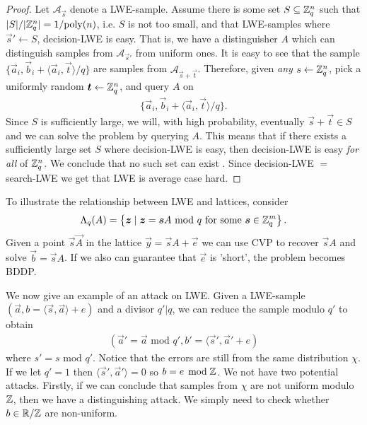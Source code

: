     \begin{proof}
        Let \(\mathcal{A}_{\vec{s}}\) denote a LWE-sample. Assume there is some set \(S\subseteq\mathbb{Z}_q^n\) such that \(|S|/|\mathbb{Z}_q^n| = 1/\text{poly}(n)\), i.e. \(S\) is not too small, and that LWE-samples where \(\vec{s}'\leftarrow S\), decision-LWE is easy. That is, we have a distinguisher \(A\) which can distinguish samples from \(\mathcal{A}_{\vec{s}'}\) from uniform ones. It is easy to see that the sample \(\{\vec{a}_i, \vec{b}_i + \langle \vec{a}_i, \vec{t}\rangle /q\}\) are samples from \(\mathcal{A}_{\vec{s}+\vec{t}}\). Therefore, given \emph{any} \(s\leftarrow\mathbb{Z}_q^n\), pick a uniformly random \(\boldsymbol{t}\leftarrow\mathbb{Z}_q^n\), and query \(A\) on 
        \begin{align*}
            \{\vec{a}_i, \vec{b}_i + \langle \vec{a}_i, \vec{t}\rangle/q\}.
        \end{align*}
        Since \(S\) is sufficiently large, we will, with high probability, eventually \(\vec{s} + \vec{t}\in S\) and we can solve the problem by querying \(A\). This means that if there exists a sufficiently large set \(S\) where decision-LWE is easy, then decision-LWE is easy \emph{for all} of \(\mathbb{Z}_q^n\). We conclude that no such set can exist . Since decision-LWE \(=\) search-LWE we get that LWE is average case hard.
    \end{proof}
    To illustrate the relationship between LWE and lattices, consider
    \begin{align*}
        \Lambda_q(A) = \left\{\boldsymbol{z}\;|\;\boldsymbol{z} = \boldsymbol{s}A\text{ mod } q \text{ for some }\boldsymbol{s}\in\mathbb{Z}_q^m\right\}.
    \end{align*}
    Given a point \(\vec{s}\vec{A}\) in the lattice \(\vec{y} = \vec{s}A + \vec{e}\) we can use CVP to recover \(\vec{s}A\) and solve \(\vec{b} = \vec{s}A\). If we also can guarantee that \(\vec{e}\) is 'short', the problem becomes BDDP.\par
    
    We now give an example of an attack on LWE. Given a LWE-sample \((\vec{a}, b = \langle \vec{s}, \vec{a}\rangle + e)\) and a divisor \(q'|q\), we can reduce the sample modulo \(q'\) to obtain
    \begin{align*}
        (\vec{a}' = \vec{a}\text{ mod } q', b' = \langle \vec{s}', \vec{a}' + e)
    \end{align*}
    where \(s' = s \text{ mod } q'\). Notice that the errors are still from the same distribution \(\chi\). If we let \(q' = 1\) then \(\langle \vec{s}', \vec{a}'\rangle = 0\) so \(b = e\mathop{}\!\mathrm{\; mod \;}\mathbb{Z}\). We not have two potential attacks. Firstly, if we can conclude that samples from \(\chi\) are not uniform modulo \(\mathbb{Z}\), then we have a distinguishing attack. We simply need to check whether \(b\in\mathbb{R}/\mathbb{Z}\) are non-uniform.\par
    
